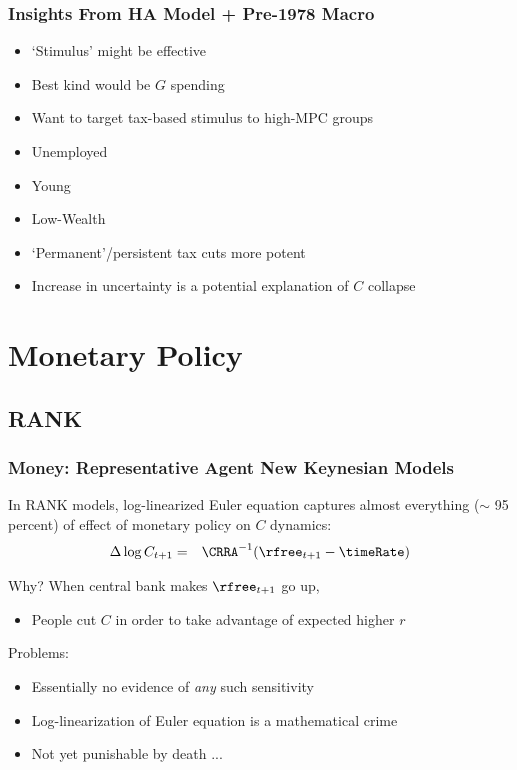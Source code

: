 \documentclass{beamer}
\begin{document}
\begin{frame}\frametitle{Insights From HA Model + Pre-1978 Macro}


\begin{itemize}
\item `Stimulus' might be effective
\bi
\item Best kind would be $G$ spending
\item Want to target tax-based stimulus to high-MPC groups
\bi
\item Unemployed
\item Young
\item Low-Wealth
\ei
\item `Permanent'/persistent tax cuts more potent
\item Increase in uncertainty is a potential explanation of $C$ collapse
\ei
\end{itemize}

\end{frame}



\section{Monetary Policy}

\subsection{RANK}
\begin{frame}\frametitle{Money: Representative Agent New Keynesian Models}

\pause 
In RANK models, log-linearized Euler equation captures almost everything ($\sim$ 95 percent) of effect of 
monetary policy on $C$ dynamics:
\begin{eqnarray*}
  \Delta \log C_{t+1} & = & \CRRA^{-1}(\rfree_{t+1}-\timeRate)
\end{eqnarray*}

\pause 
Why?  When central bank makes $\rfree_{t+1}$ go up,
\begin{itemize}
\item People cut $C$ in order to take advantage of expected higher $r$
\end{itemize}

\pause 
Problems: \pause
\begin{itemize}
\item Essentially no evidence of {\it any} such sensitivity 
\item Log-linearization of Euler equation is a mathematical crime
\bi 
\item Not yet punishable by death ...   
\ei
\end{itemize}
\end{frame}
\end{document}
